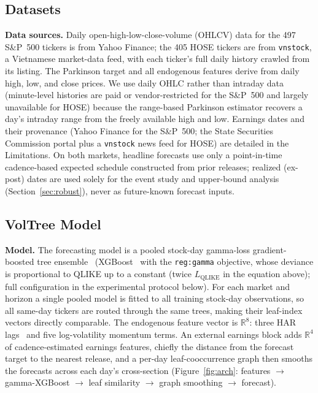 \documentclass[runningheads,a4paper]{llncs}
\begin{document}
\subsection{Datasets}
\textbf{Data sources.} Daily open-high-low-close-volume (OHLCV) data for the 497 S\&P~500 tickers is from Yahoo Finance; the 405 HOSE
tickers are from \texttt{vnstock}, a Vietnamese market-data feed, with each ticker's full daily history
crawled from its listing. The Parkinson target and all endogenous features derive from daily high, low,
and close prices. We use daily OHLC rather than intraday data (minute-level histories are paid or
vendor-restricted for the S\&P~500 and largely unavailable for HOSE) because the range-based Parkinson
estimator recovers a day's intraday range from the freely available high and low. Earnings dates and their
provenance (Yahoo Finance for the S\&P~500; the State
Securities Commission portal plus a \texttt{vnstock} news feed for HOSE) are detailed in the Limitations.
On both markets, headline forecasts use only a point-in-time cadence-based expected schedule constructed
from prior releases; realized (ex-post) dates are used solely for the event study and upper-bound analysis
(Section~\ref{sec:robust}), never as future-known forecast inputs.

\subsection{VolTree Model}\label{sec:voltree}
\textbf{Model.} The forecasting model is a pooled stock-day gamma-loss gradient-boosted tree
ensemble~\cite{friedman2001} (XGBoost~\cite{chen2016} with the \texttt{reg:gamma} objective, whose
deviance is proportional to QLIKE up to a constant (twice $L_{\mathrm{QLIKE}}$ in the equation above); full configuration in the experimental protocol
below). For each market and horizon a single pooled model is fitted to all training stock-day
observations, so all same-day tickers are routed through the same trees, making their leaf-index vectors
directly comparable. The endogenous feature vector is $\mathbb{R}^8$: three HAR lags~\cite{corsi2009} and
five log-volatility momentum terms. An external earnings block adds $\mathbb{R}^4$ of cadence-estimated
earnings features, chiefly the distance from the forecast target to the nearest release, and a
per-day leaf-cooccurrence graph then smooths the forecasts across each day's cross-section
(Figure~\ref{fig:arch}: features $\rightarrow$ gamma-XGBoost $\rightarrow$ leaf similarity $\rightarrow$
graph smoothing $\rightarrow$ forecast).
\end{document}
